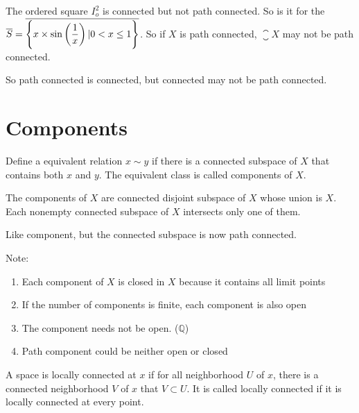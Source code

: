 \begin{example}
    The ordered square $I_o^2$ is connected but not path connected. So is it for the  $\overline{S} = \overline{\set{\displaystyle x \times \sin \left(\frac{1}{x} \right) | 0 < x \leq 1}}$. So if $X$ is path connected, $\closure{X}$ may not be path connected.
    
    So path connected is connected, but connected may not be path connected.
\end{example}


\section{Components}

\begin{definition}
    Define a equivalent relation $x \sim y$ if there is a connected subspace of $X$ that contains both $x$ and $y$. The equivalent class is called components of $X$.
\end{definition}

\begin{theorem}
The components of $X$ are connected disjoint subspace of $X$ whose union is $X$. Each nonempty connected subspace of $X$ intersects only one of them.    
\end{theorem}

\begin{definition}
    Like component, but the connected subspace is now path connected.
\end{definition}

Note: 
\begin{enumerate}
    \item Each component of $X$ is closed in $X$ because it contains all limit points
    \item If the number of components is finite, each component is also open
    \item The component needs not be open. ($\mathbb{Q}$)
    \item Path component could be neither open or closed
\end{enumerate}

\begin{definition}
    A space is locally connected at $x$ if for all neighborhood $U$ of $x$, there is a connected neighborhood $V$ of $x$ that $V \subset U$. It is called locally connected if it is locally connected at every point.
\end{definition}

